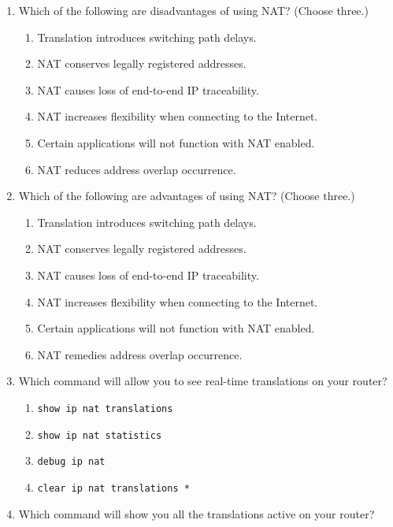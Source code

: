 \begin{enumerate}
\item
  Which of the following are disadvantages of using NAT? (Choose three.)

  \begin{enumerate}
  \tightlist
  \item
    Translation introduces switching path delays.
  \item
    NAT conserves legally registered addresses.
  \item
    NAT causes loss of end-to-end IP traceability.
  \item
    NAT increases flexibility when connecting to the Internet.
  \item
    Certain applications will not function with NAT enabled.
  \item
    NAT reduces address overlap occurrence.
  \end{enumerate}
\item
  Which of the following are advantages of using NAT? (Choose three.)

  \begin{enumerate}
  \tightlist
  \item
    Translation introduces switching path delays.
  \item
    NAT conserves legally registered addresses.
  \item
    NAT causes loss of end-to-end IP traceability.
  \item
    NAT increases flexibility when connecting to the Internet.
  \item
    Certain applications will not function with NAT enabled.
  \item
    NAT remedies address overlap occurrence.
  \end{enumerate}
\item
  Which command will allow you to see real-time translations on your
  router?

  \begin{enumerate}
  \tightlist
  \item
    \texttt{show\ ip\ nat\ translations}
  \item
    \texttt{show\ ip\ nat\ statistics}
  \item
    \texttt{debug\ ip\ nat}
  \item
    \texttt{clear\ ip\ nat\ translations\ *}
  \end{enumerate}
\item
  Which command will show you all the translations active on your
  router?


\end{enumerate}
